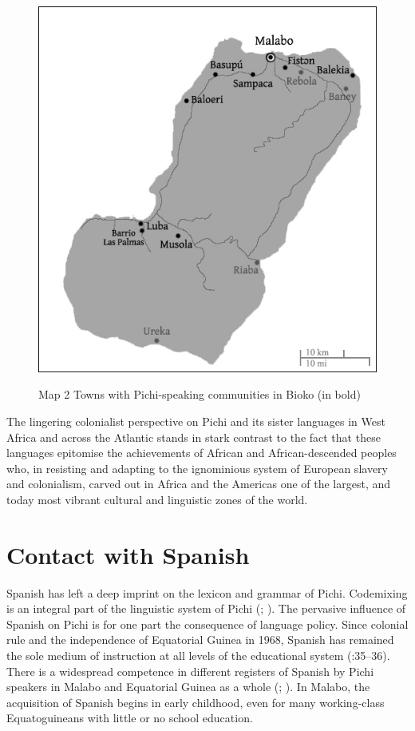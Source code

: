 \begin{figure}
	\caption{Map 2 Towns with Pichi-speaking communities in Bioko (in bold)}
	\includegraphics[width=\textwidth]{figures/yakpomod-img2.png}
	\label{map:key:1.2}
\end{figure}

 


The lingering colonialist perspective on Pichi and its sister languages in West Africa and across the Atlantic stands in stark contrast to the fact that these languages epitomise the achievements of African and African-descended peoples who, in resisting and adapting to the ignominious system of European slavery and colonialism, carved out in Africa and the Americas one of the largest, and today most vibrant cultural and linguistic zones of the world.

\section{Contact with Spanish}\label{sec:1.2}

Spanish has left a deep imprint on the lexicon and grammar of Pichi. Codemixing is an integral part of the linguistic system of Pichi (\citealt{Yakpo2009}; \citealt{Yakpo2018}). The pervasive influence of Spanish on Pichi is for one part the consequence of language policy. Since colonial rule and the independence of Equatorial Guinea in 1968, Spanish has remained the sole medium of instruction at all levels of the educational system (\citealt{Lipski1992}:35–36). There is a widespread competence in different registers of Spanish by Pichi speakers in Malabo and Equatorial Guinea as a whole (\citealt{Lipski1985}; \citealt{García2016}). In Malabo, the acquisition of Spanish begins in early childhood, even for many working-class Equatoguineans with little or no school education. 


